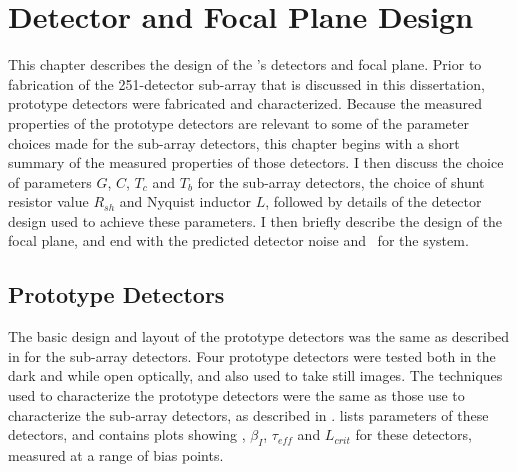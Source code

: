 \chapter{Detector and Focal Plane Design}\label{c:det-design}

This chapter describes the design of the \Imager's detectors and focal plane.
Prior to fabrication of the 251-detector sub-array that is discussed in this dissertation, prototype detectors were fabricated and characterized.
Because the measured properties of the prototype detectors are relevant to some of the parameter choices made for the sub-array detectors, this chapter begins with a short summary of the measured properties of those detectors.
I then discuss the choice of parameters $G$, $C$, $T_c$ and $T_b$ for the sub-array detectors, the choice of shunt resistor value $R_{sh}$ and Nyquist inductor $L$, followed by details of the detector design used to achieve these parameters.
I then briefly describe the design of the focal plane, and end with the predicted detector noise and \NETD\ for the system.

\section{Prototype Detectors} \label{sec:det-parm-choice}

The basic design and layout of the prototype detectors was the same as described in  for the sub-array detectors.
Four prototype detectors were tested both in the dark and while open optically, and also used to take still images.
The techniques used to characterize the prototype detectors were the same as those use to characterize the sub-array detectors, as described in .
 lists parameters of these detectors, and  contains plots showing \Loop, $\beta_I$, $\tau_{eff}$ and $L_{crit}$ for these detectors, measured at a range of bias points.

